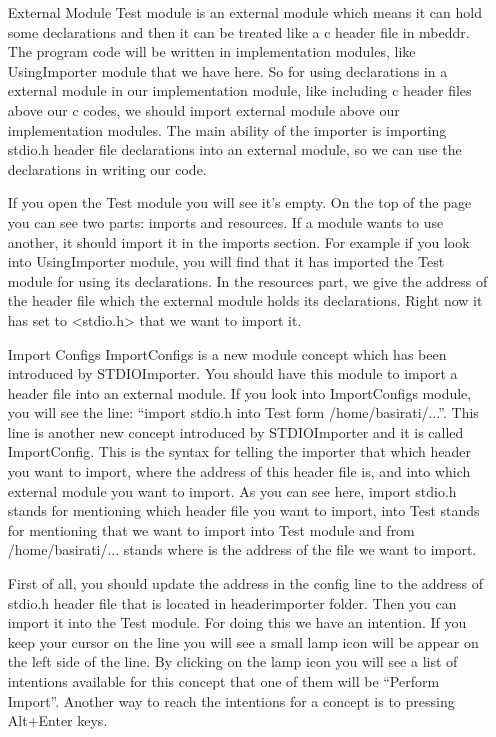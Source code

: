 \documentclass{article}
\begin{document}
\begin{itemize}
\item[External Module]
Test module is an external module which means it can hold some declarations and then it can be treated like a c header file in mbeddr. The program code will be written in implementation modules, like UsingImporter module that we have here. So for using declarations in a external module in our implementation module, like including c header files above our c codes, we should import external module above our implementation modules. The main ability of the importer is importing stdio.h header file declarations into an external module, so we can use the declarations in writing our code.

If you open the Test module you will see it's empty. On the top of the page you can see two parts: imports and resources. If a module wants to use another, it should import it in the imports section. For example if you look into UsingImporter module, you will find that it has imported the Test module for using its declarations. In the resources part, we give the address of the header file which the external module holds its declarations. Right now it has set to <stdio.h> that we want to import it.

\item[Import Configs]
ImportConfigs is a new module concept which has been introduced by STDIOImporter. You should have this module to import a header file into an external module. If you look into ImportConfigs module, you will see the line: “import stdio.h into Test form /home/basirati/...”. This line is another new concept introduced by STDIOImporter and it is called ImportConfig. This is the syntax for telling the importer that which header you want to import, where the address of this header file is, and into which external module you want to import. As you can see here, import stdio.h stands for mentioning which header file you want to import, into Test stands for mentioning that we want to import into Test module and from /home/basirati/... stands where is the address of the file we want to import.

First of all, you should update the address in the config line to the address of stdio.h header file that is located in headerimporter folder. Then you can import it into the Test module. For doing this we have an intention. If you keep your cursor on the line you will see a small lamp icon will be appear on the left side of the line. By clicking on the lamp icon you will see a list of intentions available for this concept that one of them will be “Perform Import”. Another way to reach the intentions for a concept is to pressing Alt+Enter keys.


\end{itemize}
\end{document}
